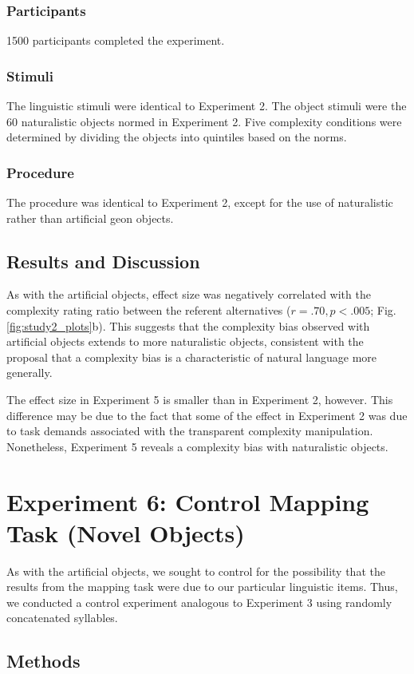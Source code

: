 \subsubsection{Participants} 1500 participants completed the experiment.
\subsubsection{Stimuli} The linguistic stimuli were identical to Experiment 2. The object stimuli were the 60 naturalistic objects normed in Experiment 2. Five complexity conditions were determined by dividing the objects into quintiles based on the norms.

\subsubsection{Procedure} The procedure was identical to Experiment 2, except for the use of naturalistic rather than artificial geon objects.

\subsection{Results and Discussion}
As with the artificial objects, effect size was negatively correlated with the complexity rating ratio between the referent alternatives ($r = .70, p < .005$; Fig. \ref{fig:study2_plots}b). This suggests that the complexity bias observed with artificial objects extends to more naturalistic objects, consistent with the proposal that a complexity bias is a characteristic of natural language more generally.

The effect size in Experiment 5 is smaller than in Experiment 2, however. This difference may be due to the fact that some of the effect in Experiment 2 was due to task demands associated with the transparent complexity manipulation. Nonetheless, Experiment 5 reveals a complexity bias with naturalistic objects.

\section{Experiment 6: Control Mapping Task (Novel Objects)}
As with the artificial objects, we sought to control for the possibility that the results from the mapping task were due to our particular linguistic items. Thus, we conducted a control experiment analogous to Experiment 3 using randomly concatenated syllables.

\subsection{Methods}

